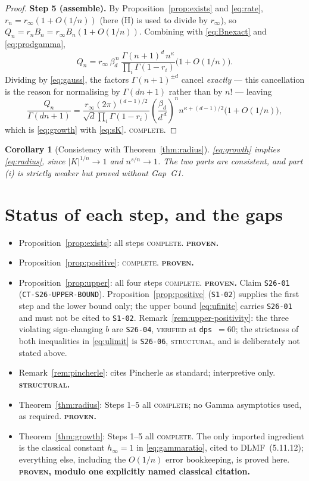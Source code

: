 \documentclass[11pt]{article}
\newtheorem{corollary}[theorem]{Corollary}
\theoremstyle{definition}
\newcommand{\bd}{\beta_d}
\newcommand{\rinf}{r_\infty}
\begin{document}
\begin{proof}
\medskip\noindent\textbf{Step 5 (assemble).}
By Proposition~\ref{prop:exists} and \eqref{eq:rate}, $r_n=\rinf(1+O(1/n))$
(here (H) is used to divide by $\rinf$), so $Q_n=r_nB_n=\rinf B_n(1+O(1/n))$.
Combining with \eqref{eq:Bnexact} and \eqref{eq:prodgamma},
\[
Q_n=\rinf\,\bd^{\,n}\,
\frac{\Gamma(n+1)^{d}\,n^{\kappa}}{\prod_i\Gamma(1-r_i)}\bigl(1+O(1/n)\bigr).
\]
Dividing by \eqref{eq:gauss}, the factors $\Gamma(n+1)^{\pm d}$ cancel
\emph{exactly} --- this cancellation is the reason for normalising by
$\Gamma(dn+1)$ rather than by $n!$ --- leaving
\[
\frac{Q_n}{\Gamma(dn+1)}
=\frac{\rinf(2\pi)^{(d-1)/2}}{\sqrt d\prod_i\Gamma(1-r_i)}
\left(\frac{\bd}{d^{\,d}}\right)^{\!n}
n^{\kappa+(d-1)/2}\bigl(1+O(1/n)\bigr),
\]
which is \eqref{eq:growth} with \eqref{eq:sK}. \textsc{complete.}
\end{proof}

\begin{corollary}[Consistency with Theorem~\ref{thm:radius}]
\eqref{eq:growth} implies \eqref{eq:radius}, since $|K|^{1/n}\to1$ and
$n^{s/n}\to1$. The two parts are consistent, and part (i) is strictly weaker but
proved without Gap~G1.
\end{corollary}

\section{Status of each step, and the gaps}\label{sec:gaps}

\begin{itemize}
\item Proposition~\ref{prop:exists}: all steps \textsc{complete}.
\textbf{\textsc{proven}.}
\item Proposition~\ref{prop:positive}: \textsc{complete}. \textbf{\textsc{proven}.}
\item Proposition~\ref{prop:upper}: all four steps \textsc{complete}.
\textbf{\textsc{proven}.} Claim \texttt{S26-01}
(\texttt{CT-S26-UPPER-BOUND}). Proposition~\ref{prop:positive}
(\texttt{S1-02}) supplies the first step and the lower bound only; the upper
bound \eqref{eq:ufinite} carries \texttt{S26-01} and must not be cited to
\texttt{S1-02}. Remark~\ref{rem:upper-positivity}: the three violating
sign-changing $b$ are \texttt{S26-04}, \textsc{verified} at
\texttt{dps}~$=60$; the strictness of both inequalities in \eqref{eq:ulimit} is
\texttt{S26-06}, \textsc{structural}, and is deliberately not stated above.
\item Remark~\ref{rem:pincherle}: cites Pincherle as standard; interpretive only.
\textbf{\textsc{structural}.}
\item Theorem~\ref{thm:radius}: Steps 1--5 all \textsc{complete}; no Gamma
asymptotics used, as required. \textbf{\textsc{proven}.}
\item Theorem~\ref{thm:growth}: Steps 1--5 all \textsc{complete}. The only
imported ingredient is the classical constant $h_\infty=1$ in
\eqref{eq:gammaratio}, cited to DLMF~(5.11.12); everything else, including the
$O(1/n)$ error bookkeeping, is proved here. \textbf{\textsc{proven}, modulo one
explicitly named classical citation.}
\end{itemize}
\end{document}
